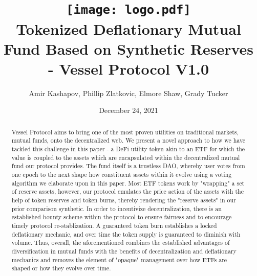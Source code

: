 \documentclass[letterpaper,11pt]{article}
\begin{document}
\pagecolor{yellow!20}

\title{
\vspace{4cm}
\texttt{[image: logo.pdf]}\\
\vspace{0.75cm}
\textbf{Tokenized Deflationary Mutual Fund Based on Synthetic Reserves - Vessel Protocol V1.0}}
\author{Amir Kashapov, Phillip Zlatkovic, Elmore Shaw, Grady Tucker}
\date{December 24, 2021}
\maketitle

\vspace{0.15cm}

\begin{abstract}
Vessel Protocol aims to bring one of the most proven utilities on traditional markets, mutual funds, onto the decentralized web. We present a novel approach to how we have tackled this challenge in this paper - a DeFi utility token akin to an ETF for which the value is coupled to the assets which are encapsulated within the decentralized mutual fund our protocol provides. The fund itself is a trustless DAO, whereby user votes from one epoch to the next shape how constituent assets within it evolve using a voting algorithm we elaborate upon in this paper. Most ETF tokens work by "wrapping" a set of reserve assets, however, our protocol emulates the price action of the assets with the help of token reserves and token burns, thereby rendering the "reserve assets" in our prior comparison synthetic. In order to incentivize decentralization, there is an established bounty scheme within the protocol to ensure fairness and to encourage timely protocol re-stablization. A guaranteed token burn establishes a locked deflationary mechanic, and over time the token supply is guaranteed to diminish with volume. Thus, overall, the aforementioned combines the established advantages of diversification in mutual funds with the benefits of decentralization and deflationary mechanics and removes the element of "opaque" management over how ETFs are shaped or how they evolve over time.
\end{abstract}

\pagebreak

\tableofcontents

\pagebreak
\end{document}
